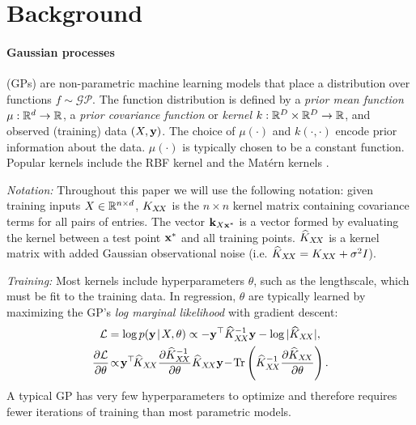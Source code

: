 \section{Background}
\paragraph{Gaussian processes} (GPs) are non-parametric machine learning models that place a distribution over functions $f \sim \mathcal{GP}$.
The function distribution is defined by a \emph{prior mean function} $\mu: \mathbb{R}^d \to \mathbb{R}$, a \emph{prior covariance function} or \emph{kernel} $k: \mathbb{R}^D \times \mathbb{R}^D \to \mathbb{R}$, and observed (training) data $(X, \mathbf{y})$.
The choice of $\mu(\cdot)$ and $k(\cdot, \cdot)$ encode prior information about the data.
$\mu(\cdot)$ is typically chosen to be a constant function.
Popular kernels include the RBF kernel and the Mat\'ern kernels \citep{rasmussen2006gaussian}.

\emph{Notation:} Throughout this paper we will use the following notation:
given training inputs $X \in \mathbb{R}^{n \times d}$, $K_{X \! X}$ is the $n \times n$ kernel matrix containing covariance terms for all pairs of entries.
The vector $\mathbf{k}_{X \mathbf{x}^*}$ is a vector formed by evaluating the kernel between a test point $\mathbf{x}^*$ and all training points.
$\widehat {K}_{X \! X}$ is a kernel matrix with added Gaussian observational noise (i.e. $\widehat {K}_{X \! X} = K_{X \! X} + \sigma^2 I$).

\emph{Training:} Most kernels include hyperparameters $\theta$, such as the lengthscale, which must be fit to the training data.
In regression, $\theta$ are typically learned by maximizing the GP's \emph{log marginal likelihood} with gradient descent:
%
\begin{align}
	\mathcal L &= \log p(\by \! \mid \! X, \theta) \propto - \by^\top {\widehat \bK_{\bX \! \bX}}^{-1} \by - \log \vert \widehat K_{\bX \! \bX} \vert,
  \label{eq:gp_mll}
  \\
	\frac{\partial \mathcal L}{\partial \theta} \! &\propto \! \by^\top \! \widehat \bK_{\bX \! \bX} \frac{\partial {\widehat \bK_{\bX \! \bX}}^{-1}}{\partial \theta} \widehat \bK_{\bX \! \bX} \by \! - \! \tr{ \widehat \bK_{\bX \! \bX}^{-1} \frac{\partial \widehat \bK_{\bX \! \bX}}{\partial \theta}}.
  \label{eq:gp_mll_deriv}
\end{align}
%
A typical GP has very few hyperparameters to optimize and therefore requires fewer iterations of training than most parametric models.


